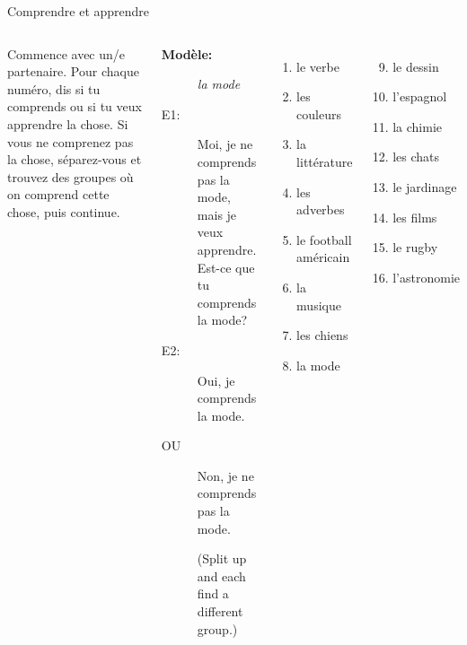 \begin{frame}{Comprendre et apprendre}
  \begin{columns}[t]
      {\small
      Commence avec un/e partenaire.
      Pour chaque numéro, dis si tu \alert{comprends} ou si tu veux \alert{apprendre} la chose.
      Si vous ne comprenez pas la chose, séparez-vous et trouvez des groupes où on comprend cette chose, puis continue.} \\
      \scriptsize
      \begin{description}
        \item[\textbf{Modèle:}] \emph{la mode}
        \item[E1:] Moi, je ne comprends pas la mode, mais je veux apprendre. Est-ce que tu comprends la mode?
        \item[E2:] Oui, je comprends la mode.
        \item[OU] Non, je ne comprends pas la mode.
        \item[] {\tiny (Split up and each find a different group.)}
      \end{description}
      \begin{columns}[t]
          \begin{enumerate}
            \item le verbe 
            \item les couleurs
            \item la littérature
            \item les adverbes
            \item le football américain
            \item la musique
            \item les chiens
            \item la mode
          \end{enumerate}
          \begin{enumerate}
            \setcounter{enumi}{8}
            \item le dessin
            \item l'espagnol
            \item la chimie
            \item les chats
            \item le jardinage
            \item les films
            \item le rugby
            \item l'astronomie
          \end{enumerate}
      \end{columns}
  \end{columns}
\end{frame}